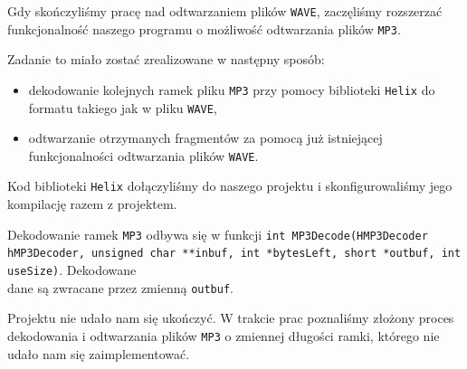 \documentclass[12pt,a4paper]{article}
\begin{document}
Gdy skończyliśmy pracę nad odtwarzaniem plików \texttt{WAVE}, zaczęliśmy rozszerzać funkcjonalność naszego programu o możliwość odtwarzania plików \texttt{MP3}.

Zadanie to miało zostać zrealizowane w następny sposób:
\begin{itemize}
 \item dekodowanie kolejnych ramek pliku \texttt{MP3} przy pomocy biblioteki \texttt{Helix} do formatu takiego jak w pliku \texttt{WAVE},
 \item odtwarzanie otrzymanych fragmentów za pomocą już istniejącej funkcjonalności odtwarzania plików \texttt{WAVE}.
\end{itemize}

Kod biblioteki \texttt{Helix} dołączyliśmy do naszego projektu i skonfigurowaliśmy jego kompilację razem z projektem.

Dekodowanie ramek \texttt{MP3} odbywa się w funkcji \texttt{int MP3Decode(HMP3Decoder hMP3Decoder, unsigned char **inbuf, int *bytesLeft, short *outbuf, int useSize)}. Dekodowane \\ dane są zwracane przez zmienną \texttt{outbuf}.

Projektu nie udało nam się ukończyć. W trakcie prac poznaliśmy złożony proces dekodowania i odtwarzania plików \texttt{MP3} o zmiennej długości ramki, którego nie udało nam się zaimplementować.
\end{document}
